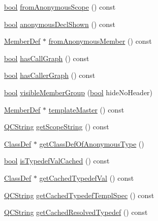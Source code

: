 \begin{DoxyCompactItemize}
\item 
\hyperlink{qglobal_8h_a1062901a7428fdd9c7f180f5e01ea056}{bool} \hyperlink{class_member_def_a79bdc195dcd5d9f91cb440406c67fd9a}{from\+Anonymous\+Scope} () const 
\item 
\hyperlink{qglobal_8h_a1062901a7428fdd9c7f180f5e01ea056}{bool} \hyperlink{class_member_def_abdd822b8a7da2f6a600ea4756f3ac387}{anonymous\+Decl\+Shown} () const 
\item 
\hyperlink{class_member_def}{Member\+Def} $\ast$ \hyperlink{class_member_def_a573c10e5cf4f6254a721db7364629fb8}{from\+Anonymous\+Member} () const 
\item 
\hyperlink{qglobal_8h_a1062901a7428fdd9c7f180f5e01ea056}{bool} \hyperlink{class_member_def_a10620e17dc1092ded7fed7f6cafa321a}{has\+Call\+Graph} () const 
\item 
\hyperlink{qglobal_8h_a1062901a7428fdd9c7f180f5e01ea056}{bool} \hyperlink{class_member_def_a241a6bc4932593f02d7a8f14cd620af3}{has\+Caller\+Graph} () const 
\item 
\hyperlink{qglobal_8h_a1062901a7428fdd9c7f180f5e01ea056}{bool} \hyperlink{class_member_def_a542cbc35f38ab6ec9006655b03269941}{visible\+Member\+Group} (\hyperlink{qglobal_8h_a1062901a7428fdd9c7f180f5e01ea056}{bool} hide\+No\+Header)
\item 
\hyperlink{class_member_def}{Member\+Def} $\ast$ \hyperlink{class_member_def_aae2b998bf1ff62c15495b4e07790ba67}{template\+Master} () const 
\item 
\hyperlink{class_q_c_string}{Q\+C\+String} \hyperlink{class_member_def_a6b61a80e5ef698a86dee0a89516a999d}{get\+Scope\+String} () const 
\item 
\hyperlink{class_class_def}{Class\+Def} $\ast$ \hyperlink{class_member_def_a55dd478aba299892bdf1f4d22c21c95a}{get\+Class\+Def\+Of\+Anonymous\+Type} ()
\item 
\hyperlink{qglobal_8h_a1062901a7428fdd9c7f180f5e01ea056}{bool} \hyperlink{class_member_def_abd37d3d75c4b696f99aa8271ceeb0ede}{is\+Typedef\+Val\+Cached} () const 
\item 
\hyperlink{class_class_def}{Class\+Def} $\ast$ \hyperlink{class_member_def_a1713cc3cd17816305441f765512cae86}{get\+Cached\+Typedef\+Val} () const 
\item 
\hyperlink{class_q_c_string}{Q\+C\+String} \hyperlink{class_member_def_a3a8a1d0f6028887a76a0a4265af049bf}{get\+Cached\+Typedef\+Templ\+Spec} () const 
\item 
\hyperlink{class_q_c_string}{Q\+C\+String} \hyperlink{class_member_def_a96277d02e54cfcec226a7a066fb59d2f}{get\+Cached\+Resolved\+Typedef} () const 

\end{DoxyCompactItemize}
